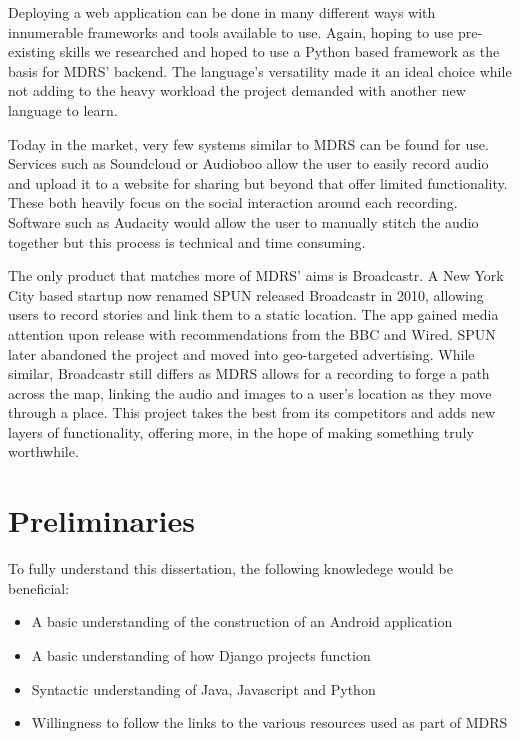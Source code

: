 \documentclass{l3proj}
\begin{document}
Deploying a web application can be done in many different ways with innumerable frameworks and tools available to use. Again, hoping to use pre-existing skills we researched and hoped to use a Python based framework as the basis for MDRS’ backend.  The language's versatility made it an ideal choice while not adding to the heavy workload the project demanded with another new language to learn.

Today in the market, very few systems similar to MDRS can be found for use. Services such as Soundcloud or Audioboo allow the user to easily record audio and upload it to a website for sharing but beyond that offer limited functionality. These both heavily focus on the social interaction around each recording. Software such as Audacity would allow the user to manually stitch the audio together but this process is technical and time consuming.

The only product that matches more of MDRS’ aims is Broadcastr. A New York City based startup now renamed SPUN released Broadcastr in 2010, allowing users to record stories and link them to a static location. The app gained media attention upon release with recommendations from the BBC and Wired. SPUN later abandoned the project and moved into geo-targeted advertising. While similar, Broadcastr still differs as MDRS allows for a recording to forge a path across the map, linking the audio and images to a user’s location as they move through a place. This project takes the best from its competitors and adds new layers of functionality, offering more, in the hope of making something truly worthwhile.

\section{Preliminaries}
To fully understand this dissertation, the following knowledege would be beneficial:
\begin{itemize}
\item A basic understanding of the construction of an Android application
\item A basic understanding of how Django projects function
\item Syntactic understanding of Java, Javascript and Python
\item Willingness to follow the links to the various resources used as part of MDRS
\end{itemize}

\end{document}
